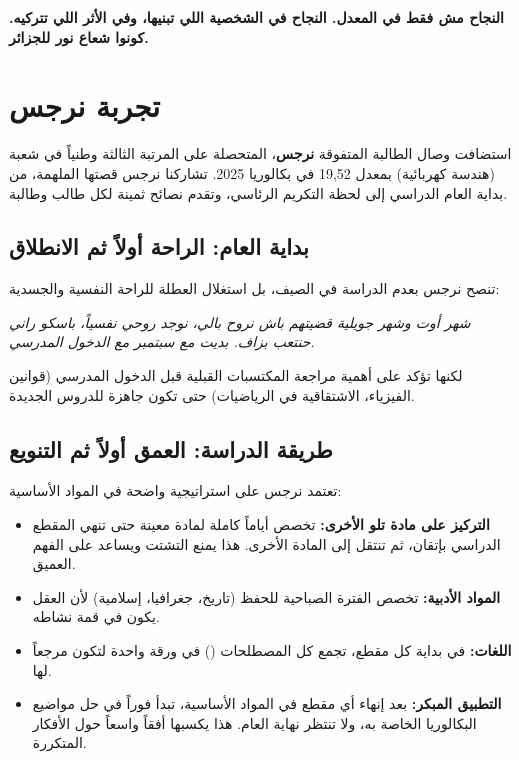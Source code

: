 \documentclass[12pt,a4paper]{book}
\newcommand{\quoteAr}[1]{%
	\begin{myquote}
		\itshape #1
	\end{myquote}
}
\newcommand{\importantAr}[1]{%
	\begin{important}
		\bfseries #1
	\end{important}
}
\begin{document}
	\importantAr{النجاح مش فقط في المعدل. النجاح في الشخصية اللي تبنيها، وفي الأثر اللي تتركيه. كونوا شعاع نور للجزائر.}
	
	
	\section{تجربة نرجس}
	
	استضافت وصال الطالبة المتفوقة \textbf{نرجس}، المتحصلة على المرتبة الثالثة وطنياً في شعبة  (هندسة كهربائية) بمعدل 19,52 في بكالوريا 2025. تشاركنا نرجس قصتها الملهمة، من بداية العام الدراسي إلى لحظة التكريم الرئاسي، وتقدم نصائح ثمينة لكل طالب وطالبة.
	
	\subsection{بداية العام: الراحة أولاً ثم الانطلاق}
	تنصح نرجس بعدم الدراسة في الصيف، بل استغلال العطلة للراحة النفسية والجسدية:
	\quoteAr{شهر أوت وشهر جويلية قضيتهم باش نروح بالي، نوجد روحي نفسياً، باسكو راني حنتعب بزاف. بديت مع سبتمبر مع الدخول المدرسي.}
	لكنها تؤكد على أهمية مراجعة المكتسبات القبلية قبل الدخول المدرسي (قوانين الفيزياء، الاشتقاقية في الرياضيات) حتى تكون جاهزة للدروس الجديدة.
	
	\subsection{طريقة الدراسة: العمق أولاً ثم التنويع}
	\label{sec:owner-experiences13}
	تعتمد نرجس على استراتيجية واضحة في المواد الأساسية:
	\begin{itemize}
		\item \textbf{التركيز على مادة تلو الأخرى:} تخصص أياماً كاملة لمادة معينة حتى تنهي المقطع الدراسي بإتقان، ثم تنتقل إلى المادة الأخرى. هذا يمنع التشتت ويساعد على الفهم العميق.
		\item \textbf{المواد الأدبية:} تخصص الفترة الصباحية للحفظ (تاريخ، جغرافيا، إسلامية) لأن العقل يكون في قمة نشاطه.
		\item \textbf{اللغات:} في بداية كل مقطع، تجمع كل المصطلحات () في ورقة واحدة لتكون مرجعاً لها.
		\item \textbf{التطبيق المبكر:} بعد إنهاء أي مقطع في المواد الأساسية، تبدأ فوراً في حل مواضيع البكالوريا الخاصة به، ولا تنتظر نهاية العام. هذا يكسبها أفقاً واسعاً حول الأفكار المتكررة.
	\end{itemize}
	
\end{document}
